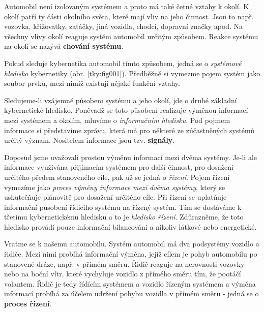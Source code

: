       Automobil není izolovaným systémem a proto má také četné vztahy k okolí. K okolí  patří ty části okolního světa, které mají vliv na jeho činnost. Jsou to např.
      vozovka, křižovatky, zatáčky, jiná vozidla, chodci, dopravní značky apod. Na všechny vlivy
      okolí reaguje systém automobil určitým způsobem. Reakce systému na okolí se nazývá
      \textbf{chování systému}. 

      
      Pokud sleduje kybernetika automobil tímto způsobem, jedná se o \emph{systémové hledisko}
      kybernetiky  (obr. \ref{tky:fig001}). Předběžně si vymezme pojem systém jako soubor prvků,
      mezi nimiž existuji nějaké funkční vztahy. 
      
      Sledujeme-li vzájemné působeni systému a jeho okolí, jde o druhé základní kybernetické
      hledisko. Poněvadž se toto působení realizuje výměnou informací mezi systémem a okolím,
      mluvíme o \emph{informačním hledisku}. Pod pojmem informace si představíme zprávu, která má
      pro některé ze zúčastněných systémů určitý význam. Nositelem informace jsou tzv.
      \textbf{signály}.
      
      Doposud jsme uvažovali prostou výměnu informací mezi dvěma systémy. Je-li ale informace 
      využívána přijímacím systémem pro další činnost, pro dosažení určitého předem stanoveného 
      cíle, pak už se jedná o \emph{řízení}. Pojem řízení vymezíme jako \emph{proces výměny 
      informace mezi dvěma systémy}, který se uskutečňuje plánovitě pro dosažení určitého cíle. Při 
      řízení se uplatňuje informační působení řídicího systému na řízený systém. Tím se dostáváme k 
      třetímu kybernetickému hledisku a to je \emph{hledisko řízení}. Zdůrazněme, že toto hledisko 
      provádí pouze informační bilancování a nikoliv látkové nebo energetické.
      
      Vraťme se k našemu automobilu. Systém automobil má dva podsystémy vozidlo a řidiče. Mezi nimi 
      probíhá informační výměna, jejíž cílem je pohyb automobilu po stanovené dráze, např. v přímém 
      směru. Řidič reaguje na nerovnosti vozovky nebo na boční vítr, které vychyluje vozidlo z 
      přímého směru tím, že pootáčí volantem. Řidič je tedy řídícím systémem a vozidlo řízeným 
      systémem a výměna informací probíhá za účelem udržení pohybu vozidla v přímém směru - jedná 
      se o \textbf{proces řízení}.
      
